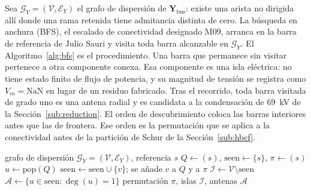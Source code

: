 Sea $\mathcal{G}_Y=(\mathcal{V},\mathcal{E}_Y)$ el grafo de dispersión de $\mathbf{Y}_{\mathrm{bus}}$: existe una arista no dirigida allí donde una rama retenida tiene admitancia distinta de cero. La búsqueda en anchura (BFS), el escalado de conectividad designado M09, arranca en la barra de referencia de Julio Sauri y visita toda barra alcanzable en $\mathcal{G}_Y$. El Algoritmo~\ref{alg:bfs} es el procedimiento. Una barra que permanece sin visitar pertenece a otra componente conexa. Esa componente es una isla eléctrica: no tiene estado finito de flujo de potencia, y su magnitud de tensión se registra como $V_m=\mathrm{NaN}$ en lugar de un residuo fabricado. Tras el recorrido, toda barra visitada de grado uno es una antena radial y es candidata a la condensación de 69~kV de la Sección~\ref{sub:reduction}. El orden de descubrimiento coloca las barras interiores antes que las de frontera. Ese orden es la permutación que se aplica a la conectividad antes de la partición de Schur de la Sección~\ref{sub:hbcf}.

\begin{algorithm}[!t]
\caption{Escalado por búsqueda en anchura sobre el grafo de admitancias (M09, BFS)}
\label{alg:bfs}
\begin{algorithmic}[1]
\Require grafo de dispersión $\mathcal{G}_Y=(\mathcal{V},\mathcal{E}_Y)$, referencia $s$
\State $Q \gets (s)$, $\mathrm{seen}\gets\{s\}$, $\pi\gets(s)$
  \State $u \gets \mathrm{pop}(Q)$
      \State $\mathrm{seen}\gets\mathrm{seen}\cup\{v\}$; se añade $v$ a $Q$ y a $\pi$
    \EndIf
  \EndFor
\EndWhile
\State $\mathcal{I}\gets\mathcal{V}\setminus\mathrm{seen}$ 
\State $\mathcal{A}\gets\{u\in\mathrm{seen}:\deg(u)=1\}$ 
\State \Return permutación $\pi$, islas $\mathcal{I}$, antenas $\mathcal{A}$
\end{algorithmic}
\end{algorithm}

